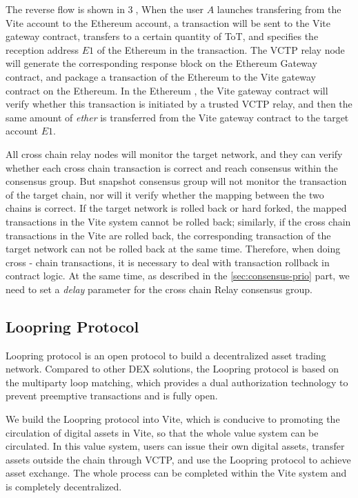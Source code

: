 \documentclass[UTF8,nofonts]{article}
\begin{document}
\begin{multicols}{2}
The reverse flow is shown in \textcircled{3}, When the user $A$ launches transfering from the Vite account to the Ethereum account, a transaction will be sent to the Vite gateway contract, transfers to a certain quantity of ToT, and specifies the reception address $E1$ of the Ethereum  in the transaction. The VCTP relay node will generate the corresponding response block on the Ethereum Gateway contract, and package a transaction of the Ethereum to the Vite gateway contract on the Ethereum. In the Ethereum , the Vite gateway contract will verify whether this transaction is initiated by a trusted VCTP relay, and then the same amount of \textit{ether} is transferred from the Vite gateway contract to the target account $E1$.

All cross chain relay nodes will monitor the target network, and they can verify whether each cross chain transaction is correct and reach consensus within the consensus group. But snapshot consensus group will not monitor the transaction of the target chain, nor will it verify whether the mapping between the two chains is correct. If the target network is rolled back or hard forked, the mapped transactions in the Vite system cannot be rolled back; similarly, if the cross chain transactions in the Vite are rolled back, the corresponding transaction of the target network can not be rolled back at the same time. Therefore, when doing cross - chain transactions, it is necessary to deal with transaction rollback in contract logic. At the same time, as described in the \ref{sec:consensus-prio} part, we need to set a \textit{delay} parameter for the cross chain Relay consensus group.

\subsection{Loopring Protocol}
Loopring protocol \cite{loopring} is an open protocol to build a decentralized asset trading network. Compared to other DEX solutions, the Loopring protocol is based on the multiparty loop matching, which provides a dual authorization technology to prevent preemptive transactions and is fully open.

We build the Loopring protocol into Vite, which is conducive to promoting the circulation of digital assets in Vite, so that the whole value system can be circulated. In this value system, users can issue their own digital assets, transfer assets outside the chain through VCTP, and use the Loopring protocol to achieve asset exchange. The whole process can be completed within the Vite system and is completely decentralized.


\end{multicols}
\end{document}
